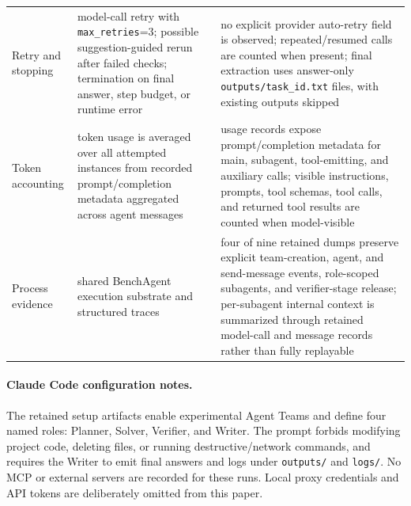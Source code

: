 \begin{table}[t]
\begin{tabular}{>{\raggedright\arraybackslash}p{} >{\raggedright\arraybackslash}p{} >{\raggedright\arraybackslash}p{}}
        Retry and stopping & model-call retry with \texttt{max\_retries}=3; possible suggestion-guided rerun after failed checks; termination on final answer, step budget, or runtime error & no explicit provider auto-retry field is observed; repeated/resumed calls are counted when present; final extraction uses answer-only \texttt{outputs/task\_id.txt} files, with existing outputs skipped \\
        Token accounting & token usage is averaged over all attempted instances from recorded prompt/completion metadata aggregated across agent messages & usage records expose prompt/completion metadata for main, subagent, tool-emitting, and auxiliary calls; visible instructions, prompts, tool schemas, tool calls, and returned tool results are counted when model-visible \\
        Process evidence & shared BenchAgent execution substrate and structured traces & four of nine retained dumps preserve explicit team-creation, agent, and send-message events, role-scoped subagents, and verifier-stage release; per-subagent internal context is summarized through retained model-call and message records rather than fully replayable \\
        \bottomrule
    \end{tabular}
\end{table}

\paragraph{Claude Code configuration notes.}
The retained setup artifacts enable experimental Agent Teams and define four named roles: Planner, Solver, Verifier, and Writer. The prompt forbids modifying project code, deleting files, or running destructive/network commands, and requires the Writer to emit final answers and logs under \texttt{outputs/} and \texttt{logs/}. No MCP or external servers are recorded for these runs. Local proxy credentials and API tokens are deliberately omitted from this paper.

